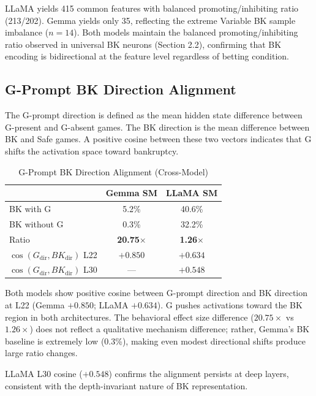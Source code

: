 \documentclass[11pt,a4paper]{article}
\begin{document}
\noindent LLaMA yields 415 common features with balanced promoting/inhibiting ratio (213/202). Gemma yields only 35, reflecting the extreme Variable BK sample imbalance ($n=14$). Both models maintain the balanced promoting/inhibiting ratio observed in universal BK neurons (Section 2.2), confirming that BK encoding is bidirectional at the feature level regardless of betting condition.

\subsection{G-Prompt BK Direction Alignment}

The G-prompt direction is defined as the mean hidden state difference between G-present and G-absent games. The BK direction is the mean difference between BK and Safe games. A positive cosine between these two vectors indicates that G shifts the activation space toward bankruptcy.

\begin{table}[H]
\centering
\caption{G-Prompt BK Direction Alignment (Cross-Model)}\label{tab:t16}
\footnotesize
\begin{tabular}{lcc}
\toprule
 & Gemma SM & LLaMA SM \\
\midrule
BK with G & 5.2\% & 40.6\% \\
BK without G & 0.3\% & 32.2\% \\
Ratio & \textbf{20.75$\times$} & \textbf{1.26$\times$} \\
$\cos(G_\mathrm{dir}, BK_\mathrm{dir})$ L22 & $\mathbf{+0.850}$ & $\mathbf{+0.634}$ \\
$\cos(G_\mathrm{dir}, BK_\mathrm{dir})$ L30 & --- & $\mathbf{+0.548}$ \\
\bottomrule
\end{tabular}
\end{table}

\noindent Both models show positive cosine between G-prompt direction and BK direction at L22 (Gemma $+0.850$; LLaMA $+0.634$). G pushes activations toward the BK region in both architectures. The behavioral effect size difference ($20.75\times$ vs $1.26\times$) does not reflect a qualitative mechanism difference; rather, Gemma's BK baseline is extremely low (0.3\%), making even modest directional shifts produce large ratio changes.

\medskip\noindent LLaMA L30 cosine ($+0.548$) confirms the alignment persists at deep layers, consistent with the depth-invariant nature of BK representation.
\end{document}
